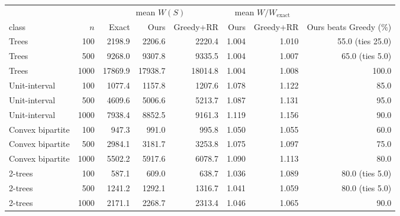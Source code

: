 \begin{tabular}{lr rrr rr r}
\toprule
 & & \multicolumn{3}{c}{mean $W(S)$} & \multicolumn{2}{c}{mean $W/W_{\mathrm{exact}}$} & \\
class & $n$ & Exact & Ours & Greedy+RR & Ours & Greedy+RR & Ours beats Greedy (\%) \\
\midrule
Trees & 100 & 2198.9 & 2206.6 & 2220.4 & 1.004 & 1.010 & 55.0 (ties 25.0) \\
Trees & 500 & 9268.0 & 9307.8 & 9335.5 & 1.004 & 1.007 & 65.0 (ties 5.0) \\
Trees & 1000 & 17869.9 & 17938.7 & 18014.8 & 1.004 & 1.008 & 100.0 \\
\midrule
Unit-interval & 100 & 1077.4 & 1157.8 & 1207.6 & 1.078 & 1.122 & 85.0 \\
Unit-interval & 500 & 4609.6 & 5006.6 & 5213.7 & 1.087 & 1.131 & 95.0 \\
Unit-interval & 1000 & 7938.4 & 8852.5 & 9161.3 & 1.119 & 1.156 & 90.0 \\
\midrule
Convex bipartite & 100 & 947.3 & 991.0 & 995.8 & 1.050 & 1.055 & 60.0 \\
Convex bipartite & 500 & 2984.1 & 3181.7 & 3253.8 & 1.075 & 1.097 & 75.0 \\
Convex bipartite & 1000 & 5502.2 & 5917.6 & 6078.7 & 1.090 & 1.113 & 80.0 \\
\midrule
2-trees & 100 & 587.1 & 609.0 & 638.7 & 1.036 & 1.089 & 80.0 (ties 5.0) \\
2-trees & 500 & 1241.2 & 1292.1 & 1316.7 & 1.041 & 1.059 & 80.0 (ties 5.0) \\
2-trees & 1000 & 2171.1 & 2268.7 & 2313.4 & 1.046 & 1.065 & 90.0 \\
\bottomrule
\end{tabular}
